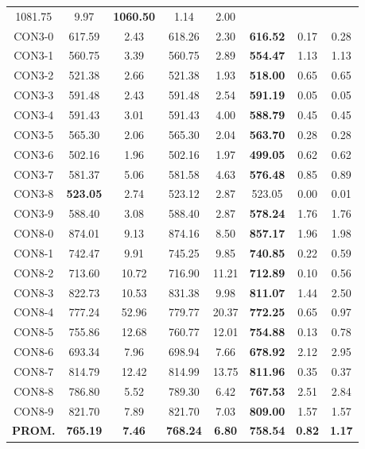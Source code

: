 \begin{table}[h]
\begin{tabular}{c c c c c c c c}
1081.75 & 9.97 & \bf{1060.50} & 
1.14 & 2.00\\CON3-0 & 617.59 & 2.43 & 
618.26 & 2.30 & \bf{616.52} & 
0.17 & 0.28\\CON3-1 & 560.75 & 3.39 & 
560.75 & 2.89 & \bf{554.47} & 
1.13 & 1.13\\CON3-2 & 521.38 & 2.66 & 
521.38 & 1.93 & \bf{518.00} & 
0.65 & 0.65\\CON3-3 & 591.48 & 2.43 & 
591.48 & 2.54 & \bf{591.19} & 
0.05 & 0.05\\CON3-4 & 591.43 & 3.01 & 
591.43 & 4.00 & \bf{588.79} & 
0.45 & 0.45\\CON3-5 & 565.30 & 2.06 & 
565.30 & 2.04 & \bf{563.70} & 
0.28 & 0.28\\CON3-6 & 502.16 & 1.96 & 
502.16 & 1.97 & \bf{499.05} & 
0.62 & 0.62\\CON3-7 & 581.37 & 5.06 & 
581.58 & 4.63 & \bf{576.48} & 
0.85 & 0.89\\CON3-8 & \bf{523.05} & 2.74 & 
523.12 & 2.87 & 523.05 & 0.00
 & 0.01\\CON3-9 & 588.40 & 3.08 & 
588.40 & 2.87 & \bf{578.24} & 
1.76 & 1.76\\CON8-0 & 874.01 & 9.13 & 
874.16 & 8.50 & \bf{857.17} & 
1.96 & 1.98\\CON8-1 & 742.47 & 9.91 & 
745.25 & 9.85 & \bf{740.85} & 
0.22 & 0.59\\CON8-2 & 713.60 & 10.72 & 
716.90 & 11.21 & \bf{712.89} & 
0.10 & 0.56\\CON8-3 & 822.73 & 10.53 & 
831.38 & 9.98 & \bf{811.07} & 
1.44 & 2.50\\CON8-4 & 777.24 & 52.96 & 
779.77 & 20.37 & \bf{772.25} & 
0.65 & 0.97\\CON8-5 & 755.86 & 12.68 & 
760.77 & 12.01 & \bf{754.88} & 
0.13 & 0.78\\CON8-6 & 693.34 & 7.96 & 
698.94 & 7.66 & \bf{678.92} & 
2.12 & 2.95\\CON8-7 & 814.79 & 12.42 & 
814.99 & 13.75 & \bf{811.96} & 
0.35 & 0.37\\CON8-8 & 786.80 & 5.52 & 
789.30 & 6.42 & \bf{767.53} & 
2.51 & 2.84\\CON8-9 & 821.70 & 7.89 & 
821.70 & 7.03 & \bf{809.00} & 
1.57 & 1.57\\\bf{PROM.} & 
\bf{765.19} & \bf{7.46} & \bf{768.24} & \bf{6.80} & \bf{758.54} & \bf{0.82} & \bf{1.17}\\[1ex]\hline
\end{tabular}
\label{table:SS-M-150-0.1}
\end{table}

